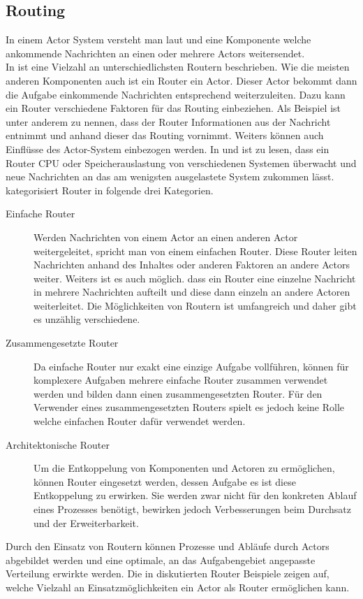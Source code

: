 \subsection{Routing}\label{sec:actor:patterns:routing}
In einem Actor System versteht man laut \cite{Vernon2015ReactiveAkka} und \cite{kuhn2017reactive} eine Komponente welche ankommende Nachrichten an einen oder mehrere Actors weitersendet. \\
In \cite{Vernon2015ReactiveAkka} ist eine Vielzahl an unterschiedlichsten Routern beschrieben. Wie die meisten anderen Komponenten auch ist ein Router ein Actor. Dieser Actor bekommt dann die Aufgabe einkommende Nachrichten entsprechend weiterzuleiten. Dazu kann ein Router verschiedene Faktoren für das Routing einbeziehen. Als Beispiel ist unter anderem zu nennen, dass der Router Informationen aus der Nachricht entnimmt und anhand dieser das Routing vornimmt. Weiters können auch Einflüsse des Actor-System einbezogen werden. In \cite{Vernon2015ReactiveAkka} und \cite{Akka.netCommunityAkka.NETDocumentation} ist zu lesen, dass ein Router CPU oder Speicherauslastung von verschiedenen Systemen überwacht und neue Nachrichten an das am wenigsten ausgelastete System zukommen lässt. \\
\cite{Vernon2015ReactiveAkka} kategorisiert Router in folgende drei Kategorien. 
\begin{description}
    \item[Einfache Router] Werden Nachrichten von einem Actor an einen anderen Actor weitergeleitet, spricht man von einem einfachen Router. Diese Router leiten Nachrichten anhand des Inhaltes oder anderen Faktoren an andere Actors weiter. Weiters ist es auch möglich. dass ein Router eine einzelne Nachricht in mehrere Nachrichten aufteilt und diese dann einzeln an andere Actoren weiterleitet. Die Möglichkeiten von Routern ist umfangreich und daher gibt es unzählig verschiedene.
    \item[Zusammengesetzte Router] Da einfache Router nur exakt eine einzige Aufgabe vollführen, können für komplexere Aufgaben mehrere einfache Router zusammen verwendet werden und bilden dann einen zusammengesetzten Router. Für den Verwender eines zusammengesetzten Routers spielt es jedoch keine Rolle welche einfachen Router dafür verwendet werden.
    \item[Architektonische Router] Um die Entkoppelung von Komponenten und Actoren zu ermöglichen, können Router eingesetzt werden, dessen Aufgabe es ist diese Entkoppelung zu erwirken. Sie werden zwar nicht für den konkreten Ablauf eines Prozesses benötigt, bewirken jedoch Verbesserungen beim Durchsatz und der Erweiterbarkeit. 
\end{description}
Durch den Einsatz von Routern können Prozesse und Abläufe durch Actors abgebildet werden und eine optimale, an das Aufgabengebiet angepasste Verteilung erwirkte werden. Die in \cite{Vernon2015ReactiveAkka} diskutierten Router Beispiele zeigen auf, welche Vielzahl an Einsatzmöglichkeiten ein Actor als Router ermöglichen kann. 

